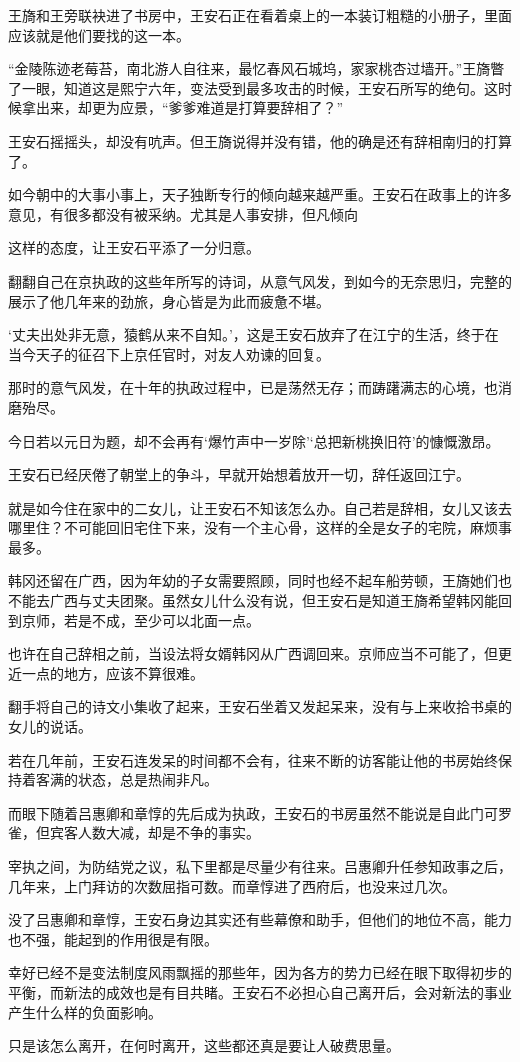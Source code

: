 王旖和王旁联袂进了书房中，王安石正在看着桌上的一本装订粗糙的小册子，里面应该就是他们要找的这一本。

“金陵陈迹老莓苔，南北游人自往来，最忆春风石城坞，家家桃杏过墙开。”王旖瞥了一眼，知道这是熙宁六年，变法受到最多攻击的时候，王安石所写的绝句。这时候拿出来，却更为应景，“爹爹难道是打算要辞相了？”

王安石摇摇头，却没有吭声。但王旖说得并没有错，他的确是还有辞相南归的打算了。

如今朝中的大事小事上，天子独断专行的倾向越来越严重。王安石在政事上的许多意见，有很多都没有被采纳。尤其是人事安排，但凡倾向

这样的态度，让王安石平添了一分归意。

翻翻自己在京执政的这些年所写的诗词，从意气风发，到如今的无奈思归，完整的展示了他几年来的劲旅，身心皆是为此而疲惫不堪。

‘丈夫出处非无意，猿鹤从来不自知。’，这是王安石放弃了在江宁的生活，终于在当今天子的征召下上京任官时，对友人劝谏的回复。

那时的意气风发，在十年的执政过程中，已是荡然无存；而踌躇满志的心境，也消磨殆尽。

今日若以元日为题，却不会再有‘爆竹声中一岁除’‘总把新桃换旧符’的慷慨激昂。

王安石已经厌倦了朝堂上的争斗，早就开始想着放开一切，辞任返回江宁。

就是如今住在家中的二女儿，让王安石不知该怎么办。自己若是辞相，女儿又该去哪里住？不可能回旧宅住下来，没有一个主心骨，这样的全是女子的宅院，麻烦事最多。

韩冈还留在广西，因为年幼的子女需要照顾，同时也经不起车船劳顿，王旖她们也不能去广西与丈夫团聚。虽然女儿什么没有说，但王安石是知道王旖希望韩冈能回到京师，若是不成，至少可以北面一点。

也许在自己辞相之前，当设法将女婿韩冈从广西调回来。京师应当不可能了，但更近一点的地方，应该不算很难。

翻手将自己的诗文小集收了起来，王安石坐着又发起呆来，没有与上来收拾书桌的女儿的说话。

若在几年前，王安石连发呆的时间都不会有，往来不断的访客能让他的书房始终保持着客满的状态，总是热闹非凡。

而眼下随着吕惠卿和章惇的先后成为执政，王安石的书房虽然不能说是自此门可罗雀，但宾客人数大减，却是不争的事实。

宰执之间，为防结党之议，私下里都是尽量少有往来。吕惠卿升任参知政事之后，几年来，上门拜访的次数屈指可数。而章惇进了西府后，也没来过几次。

没了吕惠卿和章惇，王安石身边其实还有些幕僚和助手，但他们的地位不高，能力也不强，能起到的作用很是有限。

幸好已经不是变法制度风雨飘摇的那些年，因为各方的势力已经在眼下取得初步的平衡，而新法的成效也是有目共睹。王安石不必担心自己离开后，会对新法的事业产生什么样的负面影响。

只是该怎么离开，在何时离开，这些都还真是要让人破费思量。

